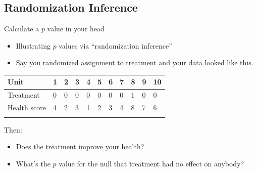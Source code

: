 \documentclass[
  11pt,
  ignorenonframetext,
]{beamer}
\providecommand{\tightlist}{%
  \setlength{\itemsep}{0pt}\setlength{\parskip}{0pt}}\usepackage{longtable,booktabs,array}
\begin{document}
\hypertarget{randomization-inference}{%
\subsection{\texorpdfstring{Randomization Inference
\label{ri}}{Randomization Inference }}\label{randomization-inference}}

\begin{frame}{Calculate a \(p\) value in your head}
\protect\hypertarget{calculate-a-p-value-in-your-head}{}
\begin{itemize}
\item
  Illustrating \(p\) values via ``randomization inference''
\item
  Say you randomized assignment to treatment and your data looked like
  this.
\end{itemize}

\begin{longtable}[]{@{}lllllllllll@{}}
\toprule\noalign{}
Unit & 1 & 2 & 3 & 4 & 5 & 6 & 7 & 8 & 9 & 10 \\
\midrule\noalign{}
\endhead
Treatment & 0 & 0 & 0 & 0 & 0 & 0 & 0 & 1 & 0 & 0 \\
Health score & 4 & 2 & 3 & 1 & 2 & 3 & 4 & 8 & 7 & 6 \\
\bottomrule\noalign{}
\end{longtable}

Then:

\begin{itemize}
\tightlist
\item
  Does the treatment improve your health?
\item
  What's the \(p\) value for the null that treatment had no effect on
  anybody?
\end{itemize}
\end{frame}
\end{document}
